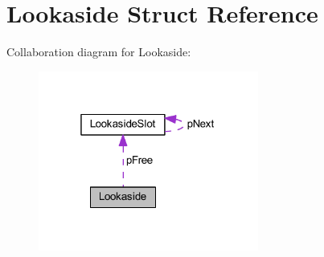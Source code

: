 \hypertarget{struct_lookaside}{\section{Lookaside Struct Reference}
\label{struct_lookaside}
}


Collaboration diagram for Lookaside\-:\nopagebreak
\begin{figure}[H]
\begin{center}
\leavevmode
\includegraphics[width=205pt]{struct_lookaside__coll__graph}
\end{center}
\end{figure}
